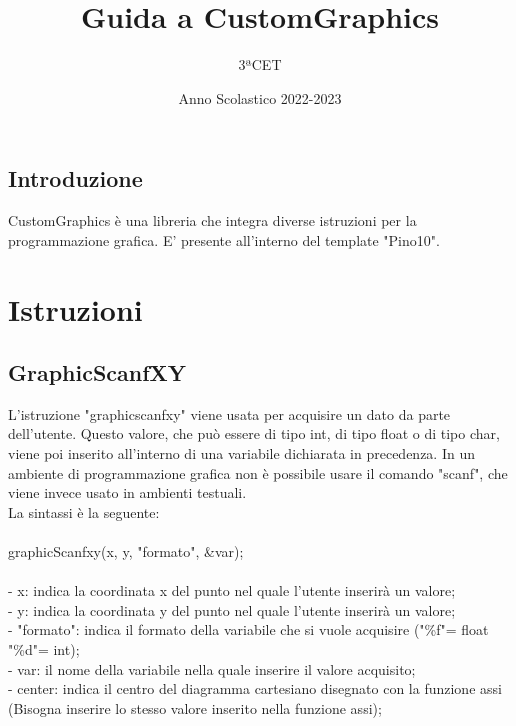 \documentclass[12pt]{book}
\title{Guida a CustomGraphics}
\author{3ªCET}
\date{Anno Scolastico 2022-2023}
\begin{document}
  
	\maketitle 
	\tableofcontents
	
	\newpage
	\section{Introduzione}
	CustomGraphics è una libreria che integra diverse istruzioni per la programmazione grafica.
	E' presente all'interno del template "Pino10".
	
	
	\chapter{Istruzioni}
		\section{GraphicScanfXY}
		L'istruzione "graphicscanfxy" viene usata per acquisire un dato da parte dell'utente. Questo valore, che può essere di tipo int, di tipo float o di tipo char, viene poi inserito all'interno di una variabile dichiarata in precedenza. In un ambiente di programmazione grafica non è possibile usare il comando "scanf", che viene invece usato in ambienti testuali.
		\\La sintassi è la seguente:
		\\
		\\
		\Large graphicScanfxy(x, y, "formato", \&var);
		\normalsize
		\\
		\\- x: indica la coordinata x del punto nel quale l'utente inserirà un valore;
		\\- y: indica la coordinata y del punto nel quale l'utente inserirà un valore;
		\\- "formato": indica il formato della variabile che si vuole acquisire ("\%f"= float "\%d"= int);
		\\- var: il nome della variabile nella quale inserire il valore acquisito;
		\\- center: indica il centro del diagramma cartesiano disegnato con la funzione assi (Bisogna inserire lo stesso valore inserito nella funzione assi);
		\newpage
\end{document}
